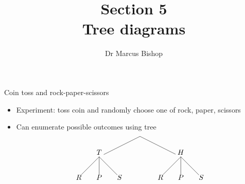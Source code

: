 \documentclass{beamer}
\title[\S5]{Section 5\\Tree diagrams}
\author{Dr Marcus Bishop}
\theoremstyle{definition}
\begin{document}
\begin{frame}\titlepage\end{frame}
\LogoOff

\begin{frame}{Coin toss and rock-paper-scissors}
\begin{itemize}
\item Experiment: toss coin and randomly choose
one of rock, paper, scissors
\item Can enumerate possible outcomes using tree
\[\begin{xy}<1cm,0cm>:
(0,0)="0";
(-2,-1)="-21";
(2,-1)="21";
"0";"-21"*+!D{T}**\dir{-};
"0";"21"*+!D{H}**\dir{-};
"-21";(-3,-2)*{R}**\dir{-};
"-21";(-2,-2)*{P}**\dir{-};
"-21";(-1,-2)*{S}**\dir{-};
"21";(1,-2)*{R}**\dir{-};
"21";(2,-2)*{P}**\dir{-};
"21";(3,-2)*{S}**\dir{-};
\end{xy}\]
\end{itemize}
\end{frame}
\end{document}
